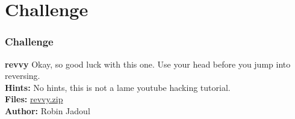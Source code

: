 \documentclass[aspectratio=169]{beamer}
\begin{document}
\section{Challenge}

\begin{frame}[fragile]
    \frametitle{Challenge}
    {
        \begin{alertblock}{\textbf{revvy}}
            Okay, so good luck with this one. Use your head before you jump into reversing.\\
            \textbf{Hints:} No hints, this is not a lame youtube hacking tutorial. \\
            \textbf{Files:} \href{https://cdn.vis.ethz.ch/ctf/chals/revvy.zip}{revvy.zip}\\
            \textbf{Author:} Robin Jadoul
        \end{alertblock}
    }
\end{frame}
\end{document}
